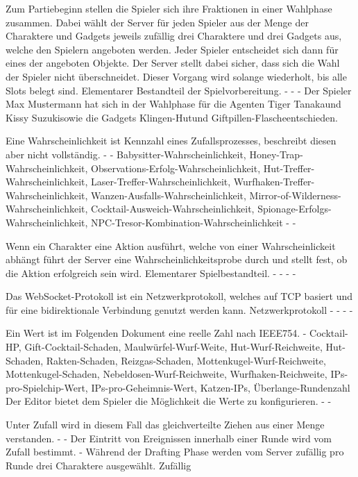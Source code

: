{Zum Partiebeginn stellen die Spieler sich ihre Fraktionen in einer Wahlphase zusammen. Dabei wählt der Server für jeden Spieler aus der Menge der Charaktere und Gadgets jeweils zufällig drei Charaktere und drei Gadgets aus, welche den Spielern angeboten werden. Jeder Spieler entscheidet sich dann für eines der angeboten Objekte. Der Server stellt dabei sicher, dass sich die Wahl der Spieler nicht überschneidet. Dieser Vorgang wird solange wiederholt, bis alle Slots belegt sind.}
{Elementarer Bestandteil der Spielvorbereitung.}
{-}
{-}
{-}
{Der Spieler \glqq Max Mustermann \grqq hat sich in der Wahlphase für die Agenten \glqq Tiger Tanaka\grqq und \glqq Kissy Suzuki\grqq sowie die Gadgets \glqq Klingen-Hut\grqq und \glqq Giftpillen-Flasche\grqq  entschieden.}

{Eine Wahrscheinlichkeit ist Kennzahl eines Zufallsprozesses, beschreibt diesen aber nicht vollständig.}
{-}
{-}
{Babysitter-Wahrscheinlichkeit, Honey-Trap-Wahrscheinlichkeit, Observations-Erfolg-Wahrscheinlichkeit, Hut-Treffer-Wahrscheinlichkeit, Laser-Treffer-Wahrscheinlichkeit, Wurfhaken-Treffer-Wahrscheinlichkeit, Wanzen-Ausfalls-Wahrscheinlichkeit, Mirror-of-Wilderness-Wahrscheinlichkeit, Cocktail-Ausweich-Wahrscheinlichkeit, Spionage-Erfolgs-Wahrscheinlichkeit, NPC-Tresor-Kombination-Wahrscheinlichkeit}
{-}
{-}

{Wenn ein Charakter eine Aktion ausführt, welche von einer Wahrscheinlickeit abhängt führt der Server eine Wahrscheinlichkeitsprobe durch und stellt fest, ob die Aktion erfolgreich sein wird.}
{Elementarer Spielbestandteil.}
{-}
{-}
{-}
{-}

{Das WebSocket-Protokoll ist ein Netzwerkprotokoll, welches auf TCP basiert und für eine bidirektionale Verbindung genutzt werden kann.}
{Netzwerkprotokoll}
{-}
{-}
{-}
{-}

{Ein Wert ist im Folgenden Dokument eine reelle Zahl nach IEEE754.}
{-}
{Cocktail-HP, Gift-Cocktail-Schaden, Maulwürfel-Wurf-Weite, Hut-Wurf-Reichweite, Hut-Schaden, Rakten-Schaden, Reizgas-Schaden, Mottenkugel-Wurf-Reichweite, Mottenkugel-Schaden, Nebeldosen-Wurf-Reichweite, Wurfhaken-Reichweite, IPs-pro-Spielchip-Wert, IPs-pro-Geheimnis-Wert, Katzen-IPs, Überlange-Rundenzahl}
{Der Editor bietet dem Spieler die Möglichkeit die Werte zu konfigurieren.}
{-}
{-}

{Unter Zufall wird in diesem Fall das gleichverteilte Ziehen aus einer Menge verstanden.}
{-}
{-}
{Der Eintritt von Ereignissen innerhalb einer Runde wird vom Zufall bestimmt.}
{-}
{Während der Drafting Phase werden vom Server zufällig pro Runde drei Charaktere ausgewählt.}
{Zufällig}

